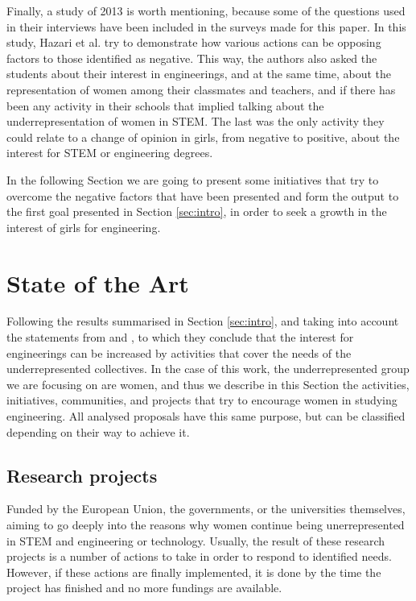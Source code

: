 \documentclass[journal,transmag]{IEEEtran}
\begin{document}
Finally, a study of 2013 \cite{hazari2013factors} is worth mentioning, because some of the questions used in their interviews have been included in the surveys made for this paper. In this study, Hazari et al. try to demonstrate how various actions can be opposing factors to those identified as negative. This way, the authors also asked the students about their interest in engineerings, and at the same time, about the representation of women among their classmates and teachers, and if there has been any activity in their schools that implied talking about the underrepresentation of women in STEM. The last was the only activity they could relate to a change of opinion in girls, from negative to positive, about the interest for STEM or engineering degrees.

In the following Section we are going to present some initiatives that try to overcome the negative factors that have been presented and form the output to the first goal presented in Section \ref{sec:intro}, in order to seek a growth in the interest of girls for engineering.

\section{State of the Art}
\label{sec:EdA}

Following the results summarised in Section \ref{sec:intro}, and taking into account the statements from \cite{everis2012} and \cite{molina2010perception}, to which they conclude that the interest for engineerings can be increased by activities that cover the needs of the underrepresented collectives. In the case of this work, the underrepresented group we are focusing on are women, and thus we describe in this Section the activities, initiatives, communities, and projects that try to encourage women in studying engineering. All analysed proposals have this same purpose, but can be classified depending on their way to achieve it.

\subsection{Research projects}

Funded by the European Union, the governments, or the universities themselves, aiming to go deeply into the reasons why women continue being unerrepresented in STEM and engineering or technology. Usually, the result of these research projects is a number of actions to take in order to respond to identified needs. However, if these actions are finally implemented, it is done by the time the project has finished and no more fundings are available.
\end{document}
